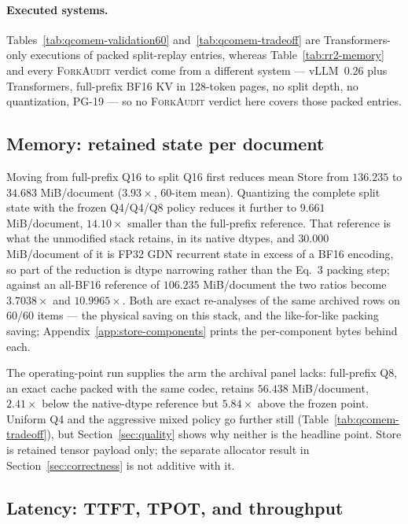 \documentclass{article}
\newcommand{\method}{\textsc{ForkAudit}}
\begin{document}
\paragraph{Executed systems.} Tables~\ref{tab:qcomem-validation60}
and~\ref{tab:qcomem-tradeoff} are Transformers-only executions of packed
split-replay entries, whereas Table~\ref{tab:rr2-memory} and every \method{}
verdict come from a different system --- vLLM~0.26 plus Transformers,
full-prefix BF16 KV in 128-token pages, no split depth, no quantization, PG-19
--- so no \method{} verdict here covers those packed entries.

\subsection{Memory: retained state per document}
\label{sec:memory}

Moving from full-prefix Q16 to split Q16 first reduces mean Store from
$136.235$ to $34.683$ MiB/document ($3.93\times$, 60-item mean).  Quantizing the complete split state with the frozen Q4/Q4/Q8
policy reduces it further to $9.661$ MiB/document, $14.10\times$ smaller than
the full-prefix reference.  That reference is what the
unmodified stack retains, in its native dtypes, and $30.000$ MiB/document of it
is FP32 GDN recurrent state in excess of a BF16 encoding, so part of the
reduction is dtype narrowing rather than the Eq.~3 packing step; against an
all-BF16 reference of $106.235$ MiB/document the two ratios become
$3.7038\times$ and $10.9965\times$.  Both are exact re-analyses of the same archived rows on 60/60 items --- the
physical saving on this stack, and the like-for-like packing saving;
Appendix~\ref{app:store-components} prints the per-component bytes behind each.

The operating-point run supplies the arm the archival panel lacks: full-prefix
Q8, an exact cache packed with the same codec, retains $56.438$ MiB/document,
$2.41\times$ below the native-dtype reference but $5.84\times$ above the frozen
point.  Uniform Q4 and the aggressive mixed policy go further still
(Table~\ref{tab:qcomem-tradeoff}), but Section~\ref{sec:quality} shows why
neither is the headline point.  Store is retained tensor payload only; the
separate allocator result in Section~\ref{sec:correctness} is not additive with
it.



\subsection{Latency: TTFT, TPOT, and throughput}
\label{sec:latency}
\end{document}
